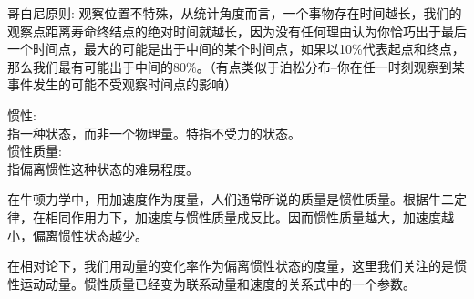 哥白尼原则: 
    观察位置不特殊，从统计角度而言，一个事物存在时间越长，我们的观察点距离寿命终结点的绝对时间就越长，因为没有任何理由认为你恰巧出于最后一个时间点，最大的可能是出于中间的某个时间点，如果以10\%代表起点和终点，那么我们最有可能出于中间的80\%。（有点类似于泊松分布--你在任一时刻观察到某事件发生的可能不受观察时间点的影响）

惯性:	\\
    指一种状态，而非一个物理量。特指不受力的状态。\\

惯性质量:   \\
    指偏离惯性这种状态的难易程度。

    在牛顿力学中，用加速度作为度量，人们通常所说的质量是惯性质量。根据牛二定律，在相同作用力下，加速度与惯性质量成反比。因而惯性质量越大，加速度越小，偏离惯性状态越少。

    在相对论下，我们用动量的变化率作为偏离惯性状态的度量，这里我们关注的是惯性运动动量。惯性质量已经变为联系动量和速度的关系式中的一个参数。

